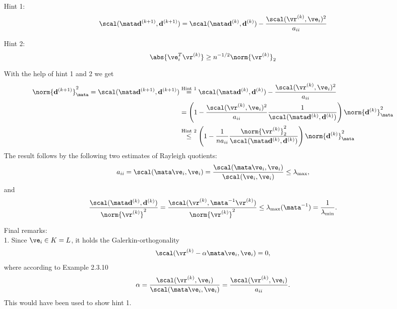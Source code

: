 \begin{SolutionSheet}[\ref{sheet8}]
\begin{Solution}
    
  \end{Solution}

  \begin{Solution}
    \hfill\\
    Hint 1:
    \begin{gather*}
      \scal(\mata\vd^{(k+1)},\vd^{(k+1)})
      =\scal(\mata\vd^{(k)},\vd^{(k)})
      -\frac{\scal(\vr^{(k)},\ve_i)^2}{a_{ii}}
    \end{gather*}

    Hint 2:
    \begin{gather*}
      \abs{\ve_i^T \vr^{(k)}} \geq n^{-\nfrac12}\norm{\vr^{(k)}}_2
    \end{gather*}

    With the help of hint 1 and 2 we get
    \begin{align*}
      \norm{\vd^{(k+1)}}_{\mata}^2
      = \scal(\mata\vd^{(k+1)},\vd^{(k+1)})
      &\stackrel{\text{Hint 1}}{=}
        \scal(\mata\vd^{(k)},\vd^{(k)})
        - \frac{\scal(\vr^{(k)},\ve_i)^2}{a_{ii}}
      \\
      &=
        \left( 1 - \frac{\scal(\vr^{(k)},\ve_i)^2}{a_{ii}}
              \frac1{\scal(\mata\vd^{(k)},\vd^{(k)})} \right)
        \norm{\vd^{(k)}}_{\mata}^2
      \\
      &\stackrel{\text{Hint 2}}{\leq}
        \left( 1 - \frac{1}{n a_{ii}}
              \frac{\norm{\vr^{(k)}}_2^2}{\scal(\mata\vd^{(k)},\vd^{(k)})} \right)
        \norm{\vd^{(k)}}_{\mata}^2
    \end{align*}
    The result follows by the following two estimates of Rayleigh quotients:
    \begin{gather*}
      a_{ii} = \scal(\mata\ve_i,\ve_i) = \frac{\scal(\mata\ve_i,\ve_i)}{\scal(\ve_i,\ve_i)}
      \le \lambda_{\max},
    \end{gather*}
    and
    \begin{gather*}
      \frac{\scal(\mata\vd^{(k)},\vd^{(k)})}{\norm{\vr^{(k)}}^2}
      = \frac{\scal(\vr^{(k)},\mata^{-1}\vr^{(k)})}{\norm{\vr^{(k)}}^2}
      \le \lambda_{\max}(\mata^{-1})
      = \frac1{\lambda_{\min}}.
    \end{gather*}

    Final remarks:\\
    1. Since $\ve_i\in K=L$, it holds the Galerkin-orthogonality
    \begin{align*}
      \scal(\vr^{(k)}-\alpha\mata \ve_i,\ve_i) = 0,
    \end{align*}
    where according to Example 2.3.10
    \begin{gather*}
      \alpha = \frac{\scal(\vr^{(k)},\ve_i)}{\scal(\mata\ve_i,\ve_i)}
      = \frac{\scal(\vr^{(k)},\ve_i)}{a_{ii}}
      .
    \end{gather*}
    This would have been used to show hint 1.


\end{Solution}
\end{SolutionSheet}
